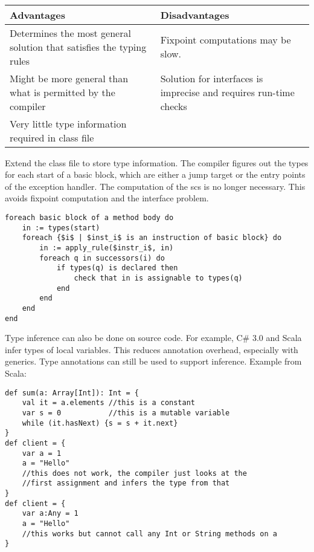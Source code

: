 \begin{mytitle}\hfill\\
\begin{center}
    \begin{tabular}{R{0.4\textwidth}|L{0.4\textwidth}}
        \textbf{Advantages} & \textbf{Disadvantages} \\
        \hline
        Determines the most general solution that satisfies the typing rules & Fixpoint computations may be slow.\\
        Might be more general than what is permitted by the compiler & Solution for interfaces is imprecise and requires run-time checks\\
        Very little type information required in class file
    \end{tabular}
\end{center}
\end{mytitle}
\begin{mytitle} Extend the class file to store type information. The compiler figures out the types for each start of a basic block, which are either a jump target or the entry points of the exception handler. The computation of the scs is no longer necessary. This avoids fixpoint computation and the interface problem.
\end{mytitle}
\begin{mytitle}\hfill
\lstset{language=pseudo}
\begin{lstlisting}[mathescape=true]
foreach basic block of a method body do
    in := types(start)
    foreach {$i$ | $inst_i$ is an instruction of basic block} do
        in := apply_rule($instr_i$, in)
        foreach q in successors(i) do
            if types(q) is declared then
                check that in is assignable to types(q)
            end
        end
    end
end
\end{lstlisting}
\end{mytitle}
\begin{mytitle}\end{mytitle}
\begin{mytitle} Type inference can also be done on source code. For example, C\# 3.0 and Scala infer types of local variables. This reduces annotation overhead, especially with generics. Type annotations can still be used to support inference. Example from Scala:
\lstset{language=Scala}
\begin{lstlisting}
def sum(a: Array[Int]): Int = {
    val it = a.elements //this is a constant
    var s = 0           //this is a mutable variable
    while (it.hasNext) {s = s + it.next}
}
def client = {
    var a = 1
    a = "Hello" 
    //this does not work, the compiler just looks at the 
    //first assignment and infers the type from that
}
def client = {
    var a:Any = 1
    a = "Hello" 
    //this works but cannot call any Int or String methods on a
}
\end{lstlisting}
\end{mytitle}
